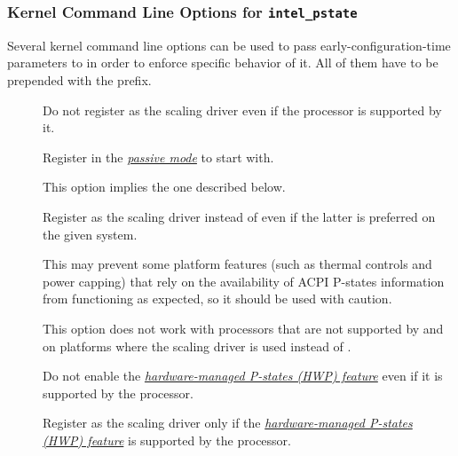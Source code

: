 \documentclass[a4paper,8pt,english]{sphinxmanual}
\begin{document}
\subsubsection{Kernel Command Line Options for \texttt{intel\_pstate}}
\label{admin-guide/pm/intel_pstate:kernel-command-line-options-for-intel-pstate}
Several kernel command line options can be used to pass early-configuration-time
parameters to  in order to enforce specific behavior of it.  All
of them have to be prepended with the  prefix.
\begin{description}
\item[{}] \leavevmode
Do not register  as the scaling driver even if the
processor is supported by it.

\item[{}] \leavevmode
Register  in the {\hyperref[admin\string-guide/pm/intel_pstate:passive\string-mode]{\emph{passive mode}}}\label{admin-guide/pm/intel_pstate:passive-mode} to
start with.

This option implies the  one described below.

\item[{}] \leavevmode
Register  as the scaling driver instead of
 even if the latter is preferred on the given system.

This may prevent some platform features (such as thermal controls and
power capping) that rely on the availability of ACPI P-states
information from functioning as expected, so it should be used with
caution.

This option does not work with processors that are not supported by
 and on platforms where the  scaling
driver is used instead of .

\item[{}] \leavevmode
Do not enable the {\hyperref[admin\string-guide/pm/intel_pstate:active\string-mode\string-with\string-hwp]{\emph{hardware-managed P-states (HWP) feature}}}\label{admin-guide/pm/intel_pstate:active-mode-with-hwp} even if it is supported by the processor.

\item[{}] \leavevmode
Register  as the scaling driver only if the
{\hyperref[admin\string-guide/pm/intel_pstate:active\string-mode\string-with\string-hwp]{\emph{hardware-managed P-states (HWP) feature}}}\label{admin-guide/pm/intel_pstate:active-mode-with-hwp} is
supported by the processor.


\end{description}
\end{document}

